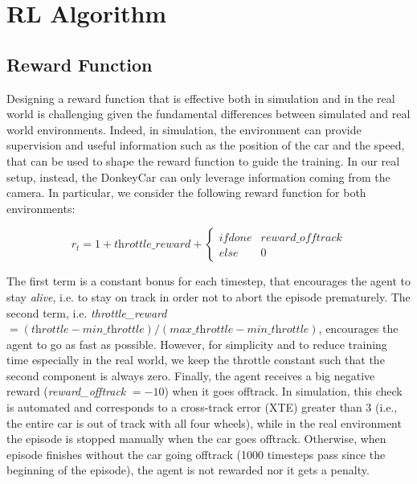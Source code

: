 \section{RL Algorithm}

\subsection{Reward Function}

Designing a reward function that is effective both in simulation and in the real world is challenging given the fundamental differences between simulated and real world environments. Indeed, in simulation, the environment can provide supervision and useful information such as the position of the car and the speed, that can be used to shape the reward function to guide the training. In our real setup, instead, the DonkeyCar can only leverage information coming from the camera. In particular, we consider the following reward function for both environments:

\begin{equation}
	\label{eq:realreward}
	r_t = 1 + \textit{throttle\_reward} + \left\{\begin{matrix}
		if \textit{done} & \textit{reward\_offtrack} \\ 
		else & 0  
	\end{matrix}\right.
\end{equation}

The first term is a constant bonus for each timestep, that encourages the agent to stay \textit{alive}, i.e. to stay on track in order not to abort the episode prematurely. The second term, i.e. \textit{throttle\_reward} $= (\textit{throttle} - \textit{min\_throttle}) / (\textit{max\_throttle} - \textit{min\_throttle})$, encourages the agent to go as fast as possible. However, for simplicity and to reduce training time especially in the real world, we keep the throttle constant such that the second component is always zero. Finally, the agent receives a big negative reward (\textit{reward\_offtrack} $= -10$) when it goes offtrack. In simulation, this check is automated and corresponds to a cross-track error (XTE) greater than 3 (i.e., the entire car is out of track with all four wheels), while in the real environment the episode is stopped manually when the car goes offtrack. Otherwise, when episode finishes without the car going offtrack (1000 timesteps pass since the beginning of the episode), the agent is not rewarded nor it gets a penalty.

